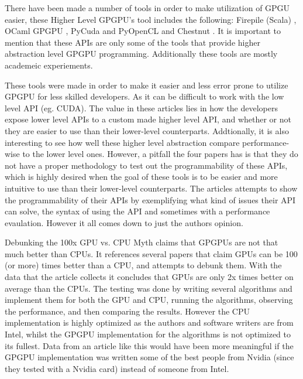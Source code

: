 There have been made a number of tools in order to make utilization of GPGU easier, these Higher Level GP\gls{GPU}'s tool includes the following: Firepile (Scala) \cite{2011_firepile}, OCaml GP\gls{GPU} \cite{bourgoin_2017_high}, PyCuda and PyOpenCL \cite{2012_pycuda_pyopencl} and Chestnut \cite{stromme_2012_chestnut}.
It is important to mention that these \glspl{API} are only some of the tools that provide higher abstraction level GPGPU programming. 
Additionally these tools are mostly academeic experiements.

These tools were made in order to make it easier and less error prone to utilize GP\gls{GPU} for less skilled developers.
As it can be difficult to work with the low level \gls{API} (eg. CUDA).
The value in these articles lies in how the developers expose lower level \glspl{API} to a custom made higher level \gls{API}, and whether or not they are easier to use than their lower-level counterparts. 
Addtionally, it is also interesting to see how well these higher level abstraction compare performance-wise to the lower level ones. 
However, a pitfall the four papers has is that they do not have a proper methodology to test out the programmability of these \glspl{API}, which is highly desired when the goal of these tools is to be easier and more intuitive to use than their lower-level counterparts.
The articles attempts to show the programmability of their \glspl{API} by exemplifying what kind of issues their \gls{API} can solve, the syntax of using the \gls{API} and sometimes with a performance evaulation.
However it all comes down to just the authors opinion.

Debunking the 100x \gls{GPU} vs. \gls{CPU} Myth \cite{lee_2010_debunking} claims that GP\glspl{GPU} are not that much better than \glspl{CPU}. 
It references several papers that claim \glspl{GPU} can be 100 (or more) times better than a \gls{CPU}, and attempts to debunk them. 
With the data that the article collects it concludes that \glspl{GPU} are only 2x times better on average than the \glspl{CPU}. 
The testing was done by writing several algorithms and implement them for both the \gls{GPU} and \gls{CPU}, running the algorithms, observing the performance, and then comparing the results. 
However the \gls{CPU} implementation is highly optimized as the authors and software writers are from Intel, whilst the GP\gls{GPU} implementation for the algorithms is not optimized to its fullest. 
Data from an article like this would have been more meaningful if the GP\gls{GPU} implementation was written some of the best people from Nvidia (since they tested with a Nvidia card) instead of someone from Intel.

